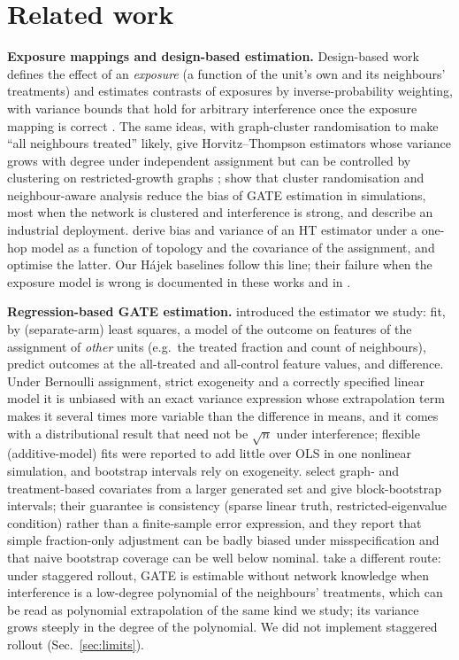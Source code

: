 \section{Related work}
\label{sec:related}
\textbf{Exposure mappings and design-based estimation.}
Design-based work defines the effect of an \emph{exposure} (a function of the unit's own and its neighbours' treatments) and estimates
contrasts of exposures by inverse-probability weighting, with variance bounds that hold for arbitrary interference once the exposure mapping is
correct \citep{aronowsamii2017}. The same ideas, with graph-cluster randomisation to make ``all neighbours treated'' likely, give Horvitz--Thompson
estimators whose variance grows with degree under independent assignment but can be controlled by clustering on restricted-growth graphs
\citep{ugander2013}; \citet{eckles2017} show that cluster randomisation and neighbour-aware analysis reduce the bias of GATE estimation in simulations,
most when the network is clustered and interference is strong, and \citet{karrer2021} describe an industrial deployment. \citet{chen2023} derive
bias and variance of an HT estimator under a one-hop model as a function of topology and the covariance of the assignment, and optimise the latter.
Our Hájek baselines follow this line; their failure when the exposure model is wrong is documented in these works and in \citet{chin2019}.

\textbf{Regression-based GATE estimation.}
\citet{chin2019} introduced the estimator we study: fit, by (separate-arm) least squares, a model of the outcome on features of the assignment of
\emph{other} units (e.g.\ the treated fraction and count of neighbours), predict outcomes at the all-treated and all-control feature values, and difference.
Under Bernoulli assignment, strict exogeneity and a correctly specified linear model it is unbiased with an exact variance expression whose
extrapolation term makes it several times more variable than the difference in means, and it comes with a distributional result that need not
be $\sqrt n$ under interference; flexible (additive-model) fits were reported to add little over OLS in one nonlinear simulation, and bootstrap
intervals rely on exogeneity.
\citet{hanugander2023} select graph- and treatment-based covariates from a larger generated set and give block-bootstrap intervals; their
guarantee is consistency (sparse linear truth, restricted-eigenvalue condition) rather than a finite-sample error expression, and they report that
simple fraction-only adjustment can be badly biased under misspecification and that naive bootstrap coverage can be well below nominal.
\citet{cortez2022} take a different route: under staggered rollout, GATE is estimable without network knowledge when interference is a low-degree
polynomial of the neighbours' treatments, which can be read as polynomial extrapolation of the same kind we study; its variance grows steeply in the degree of the polynomial.
We did not implement staggered rollout (Sec.~\ref{sec:limits}).


